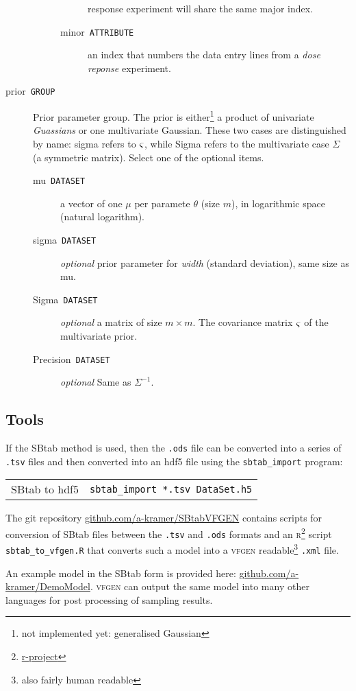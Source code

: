 \documentclass[utf8,english,DIV=12,12pt]{scrartcl}
\newcommand{\software}[1]{\textsc{#1}}
\newcommand{\standard}[1]{\textsf{#1}}
\newcommand{\stdv}[1]{\ensuremath{\ifthenelse{\equal{#1}{g}}{\varsigma}{\sigma}}}
\begin{document}
\begin{description}
\begin{description}
\begin{description}
{        response} experiment will share the same major index.
    \item[minor~\texttt{ATTRIBUTE}] an index that numbers the data entry lines
      from a \emph{dose reponse} experiment.
    \end{description}
  \end{description}
\item[prior~\texttt{GROUP}] Prior parameter group. The prior is
  either\footnote{not implemented yet: generalised Gaussian} a product
  of univariate \emph{Guassians} or one multivariate Gaussian. These
  two cases are distinguished by name: \textsf{sigma} refers to
  $\stdv{g}$, while \textsf{Sigma} refers to the multivariate case
  $\Sigma$ (a symmetric matrix). Select one of the optional items.
  \begin{description}
  \item[mu~\texttt{DATASET}] a vector of one $\mu$ per paramete
    $\theta$ (size $m$), in logarithmic space (natural logarithm).
  \item[sigma~\texttt{DATASET}] \emph{optional} prior parameter for
    \emph{width} (standard deviation), same size as \textsf{mu}.
  \item[Sigma~\texttt{DATASET}] \emph{optional} a matrix of size $m\times m$. The covariance matrix $\stdv{g}$ of the multivariate prior.
    \item[Precision~\texttt{DATASET}] \emph{optional} Same as $\Sigma^{-1}$.
  \end{description}
\end{description}

\subsection{Tools}
\label{sec:tools}

If the \standard{SBtab} method is used, then the \texttt{.ods} file can
be converted into a series of \texttt{.tsv} files and then converted
into an \standard{hdf5} file using the \texttt{sbtab\_import} program:
\begin{center}
  \begin{tabular}{rl}
    \standard{SBtab} to \standard{hdf5}&\texttt{sbtab\_import *.tsv DataSet.h5} 
  \end{tabular}
\end{center}
The git repository \url{github.com/a-kramer/SBtabVFGEN} contains
scripts for conversion of \standard{SBtab} files between the
\texttt{.tsv} and \texttt{.ods} formats and an
\software{r}\footnote{\href{https://www.r-project.org/}{r-project}}
script \texttt{sbtab\_to\_vfgen.R} that converts such a model into a \software{vfgen}
readable\footnote{also fairly human readable} \texttt{.xml} file.

An example model in the \standard{SBtab} form is provided here:
\url{github.com/a-kramer/DemoModel}.
\software{vfgen} can output the same model into many other languages for post processing of sampling results.
\end{document}
